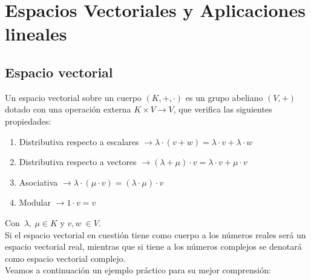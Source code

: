 




    
\chapter{Espacios Vectoriales y Aplicaciones lineales}
\section{Espacio vectorial}
Un espacio vectorial sobre un cuerpo $(K,+,\cdot)$ es un grupo abeliano $(V,+)$ dotado con una operación externa $K \times V \rightarrow V$, que verifica las siguientes propiedades:
\begin{enumerate}
\item Distributiva respecto a escalares $\rightarrow \lambda\cdot(v+w)=\lambda\cdot v+\lambda \cdot w$
\item Distributiva respecto a vectores $\rightarrow (\lambda + \mu)\cdot v= \lambda \cdot v+ \mu \cdot v$
\item Asociativa $\rightarrow \lambda \cdot (\mu \cdot v)=(\lambda \cdot \mu)\cdot v$ 
\item Modular $\rightarrow 1 \cdot v = v$
\end{enumerate}
Con\  $\lambda,\ \mu \in K$ y $v, w \ \in V$.\\
Si el espacio vectorial en cuestión tiene como cuerpo a los números reales será un espacio vectorial real, mientras que si tiene a los números complejos se denotará como espacio vectorial complejo.\\
Veamos a continuación un ejemplo práctico para su mejor comprensión:
\newpage
